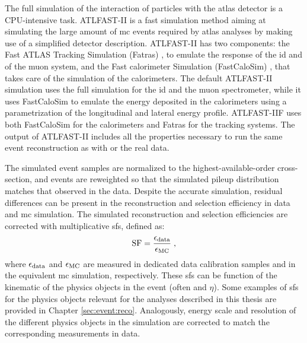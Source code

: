 The full simulation of the interaction of particles with the \gls{atlas} detector is a CPU-intensive task. 
ATLFAST-II \cite{Aad:2010ah} is a fast simulation method aiming at simulating the large amount of \gls{mc} events required by \gls{atlas} analyses by making use of a simplified detector description. 
ATLFAST-II has two components: the Fast ATLAS Tracking Simulation (Fatras) \cite{Edmonds:2008zz}, to emulate the response of the \gls{id} and of the muon system, 
and the Fast calorimeter Simulation (FastCaloSim) \cite{ATL-PHYS-PUB-2010-013}, that takes care of the simulation of the calorimeters. The default ATLFAST-II simulation uses the full \geant simulation for the \gls{id} and the muon spectrometer, 
while it uses FastCaloSim to emulate the energy deposited in the calorimeters using a parametrization of the longitudinal and lateral energy profile. 
ATLFAST-IIF uses both FastCaloSim for the calorimeters and Fatras for the tracking systems. 
The output of ATLFAST-II includes all the properties necessary to run the same event reconstruction as with \geant or the real data.


The simulated event samples are normalized to the highest-available-order cross-section, 
and events are reweighted so that the simulated pileup distribution matches that observed in the data.
Despite the accurate simulation, residual differences can be present in the reconstruction and selection efficiency in data and \gls{mc} simulation. 
The simulated reconstruction and selection efficiencies are corrected with multiplicative \glspl{sf}, defined as:
\begin{equation}
{\rm SF} = \frac{\epsilon_{\rm data}}{\epsilon_{\rm MC}} \; ,
\end{equation}
\noindent where $\epsilon_{\rm data}$ and $\epsilon_{\rm MC}$ are measured in dedicated data calibration samples 
and in the equivalent \gls{mc} simulation, respectively.
These \glspl{sf} can be function of the kinematic of the physics objects in the event (often \pt and $\eta$). 
Some examples of \glspl{sf} for the physics objects relevant for the analyses described in this thesis are provided in Chapter \ref{sec:event:reco}.
Analogously, energy scale and resolution of the different physics objects in the simulation are corrected 
to match the corresponding measurements in data.



